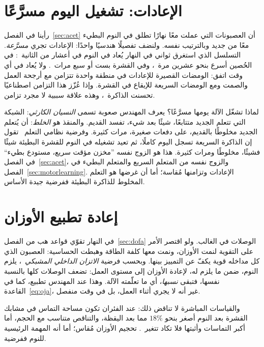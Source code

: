 \section{الإعادات: تشغيل اليوم مسرَّعًا}

رأينا في الفصل~\ref{sec:acet} أن العصبونات التي عملت معًا نهارًا تطلق في النوم البطيء معًا من جديد وبالترتيب نفسه. ولنضف تفصيلًا هندسيًا واحدًا: الإعادات تجري \emph{مسرَّعة}. التسلسل الذي استغرق ثواني في النهار يُعاد في النوم في أعشار من الثانية~\cite{Nadasdy1999}: في الحُصين أسرع بنحو عشرين مرة~\cite{LeeWilson2002}، وفي القشرة بست أو سبع مرات~\cite{Euston2007}. ولا يُعاد في أي وقت اتفق: الومضات القصيرة للإعادات في منطقة واحدة تتزامن مع أرجحة العمل والصمت ومع الومضات السريعة للإيقاع في القشرة. وإذا عُزّز هذا التزامن اصطناعيًا تحسنت الذاكرة~\cite{Maingret2016}، وهذه علاقة سببية لا مجرد تزامن.

لماذا تشغّل الآلة يومها مسرَّعًا؟ يعرف المهندس صعوبة تسمى \emph{النسيان الكارثي}: الشبكة التي تتعلم الجديد متتابعًا، شيئًا بعد شيء، تفسد القديم. والمنقذ هو \emph{الخلط}: أن يُتعلم الجديد مخلوطًا بالقديم، على دفعات صغيرة، مرات كثيرة. وفرضية نظامي التعلم~\cite{McClelland1995} تقول إن الذاكرة السريعة تسجل اليوم كاملًا، ثم تعيد تشغيله في النوم للقشرة البطيئة شيئًا فشيئًا، مخلوطًا ومرات كثيرة. هذا هو الزوج نفسه ”مخزن مؤقت سريع، مستودع بطيء“ في الفصل~\ref{sec:acet}، والزوج نفسه من المتعلم السريع والمتعلم البطيء في الفصل~\ref{sec:motorlearning}. الإعادات وتزامنها مُقاسة؛ أما أن غرضها هو التعلم المخلوط للذاكرة البطيئة ففرضية جيدة الأساس.

\section{إعادة تطبيع الأوزان}

في النهار تقوّي قواعد هب من الفصل~\ref{sec:dofa} الوصلات في الغالب. ولو اقتصر الأمر على التقوية لنمت الأوزان، ونمت معها كلفة الطاقة وهبطت الحساسية: العصبون الذي كل مداخله قوية يكفّ عن التمييز بينها. وبحسب فرضية \emph{الاتزان الداخلي المشبكي}~\cite{TononiCirelli2014}، يلزم النوم، ضمن ما يلزم له، لإعادة الأوزان إلى مستوى العمل: تضعف الوصلات كلها بالنسبة نفسها، فتبقى \emph{نسبها}، أي ما تعلّمته الآلة. وهذا عند المهندس تطبيع، كما في القاعدة~\eqref{eq:oja}، غير أنه لا يجري أثناء العمل، بل في وقت منفصل.

والقياسات المباشرة لا تناقض ذلك: عند الفئران تكون مساحة التماس في مشابك القشرة بعد النوم أصغر بنحو $18\%$ مما بعد اليقظة، والتناقص متناسب مع الحجم، أما أكبر التماسات وأثبتها فلا تكاد تتغير~\cite{deVivo2017}. تحجيم الأوزان مُقاس؛ أما أنه المهمة الرئيسية للنوم ففرضية.

